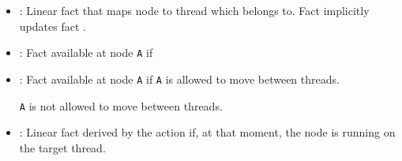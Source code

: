 \begin{itemize}

   \item {}: Linear fact that maps node 
      to thread  which  belongs to. Fact 
      implicitly updates fact .

   \item {}: Fact available at node \texttt{A} if
   \item {}: Fact available at node \texttt{A} if
      \texttt{A} is allowed to move between threads.

      \texttt{A} is not allowed to move between threads.

   \item {}: Linear fact derived by the
       action if, at that moment, the node  is running
      on the target thread.

\end{itemize}

